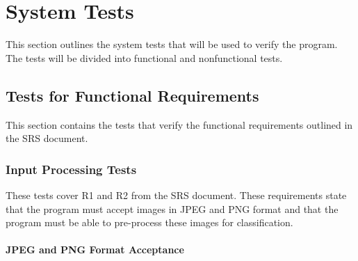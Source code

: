 \documentclass[12pt, titlepage]{article}
\begin{document}


\section{System Tests}

This section outlines the system tests that will be used to verify the \progname{}
program. The tests will be divided into functional and nonfunctional tests.

\subsection{Tests for Functional Requirements}

This section contains the tests that verify the functional requirements outlined
in the SRS document.

\subsubsection{Input Processing Tests}

These tests cover R1 and R2 from the SRS document. These requirements state that
the program must accept images in JPEG and PNG format and that the program must
be able to pre-process these images for classification.

\paragraph{JPEG and PNG Format Acceptance}
\end{document}
